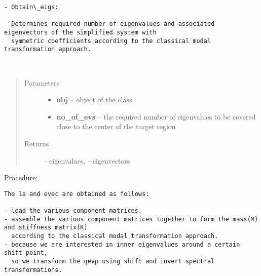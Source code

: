 \documentclass[letterpaper,10pt,english]{sphinxmanual}
\begin{document}
\begin{Verbatim}[commandchars=\\\{\}]
- Obtain\_eigs:
  
  Determines required number of eigenvalues and associated eigenvectors of the simplified system with
  symmetric coefficients according to the classical modal transformation approach.
\end{Verbatim}

\begin{fulllineitems}
\label{index:brake.solve.traditionalProjection.Obtain_eigs}~\begin{quote}\begin{description}
\item[{Parameters}] \leavevmode\begin{itemize}
\item {} 
\textbf{obj} -- object of the class 

\item {} 
\textbf{no\_of\_evs} -- the required number of eigenvalues to be covered close to the center of the target region

\end{itemize}

\item[{Returns}] \leavevmode
{} - eigenvalues,  - eigenvectors

\end{description}\end{quote}

Procedure:

\begin{Verbatim}[commandchars=\\\{\}]
The la and evec are obtained as follows:
  
- load the various component matrices.
- assemble the various component matrices together to form the mass(M) and stiffness matrix(K)
  according to the classical modal transformation approach.
- because we are interested in inner eigenvalues around a certain shift point, 
  so we transform the qevp using shift and invert spectral transformations.
\end{Verbatim}

\end{fulllineitems}
\end{document}
